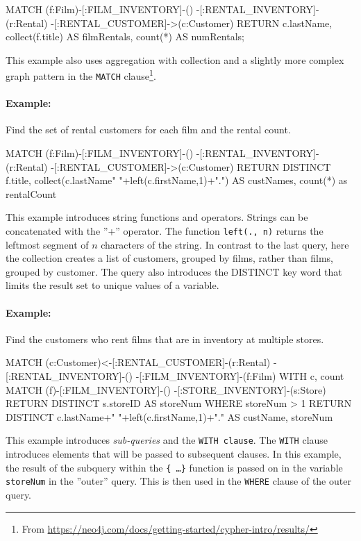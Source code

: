 \begin{withcode}
\begin{cyphercode}
MATCH (f:Film)-[:FILM_INVENTORY]-()
      -[:RENTAL_INVENTORY]-(r:Rental)
      -[:RENTAL_CUSTOMER]->(c:Customer)
RETURN c.lastName, 
       collect(f.title) AS filmRentals, 
       count(*) AS numRentals;
\end{cyphercode}

This example also uses aggregation with collection and a slightly more complex graph pattern in the \texttt{MATCH} clause\footnote{From \url{https://neo4j.com/docs/getting-started/cypher-intro/results/}}.

\paragraph*{Example:} Find the set of rental customers for each film and the rental count.

\begin{cyphercode}
MATCH (f:Film)-[:FILM_INVENTORY]-()
      -[:RENTAL_INVENTORY]-(r:Rental)
      -[:RENTAL_CUSTOMER]->(c:Customer)
RETURN DISTINCT f.title, 
      collect(c.lastName" "+left(c.firstName,1)+".") AS custNames, 
      count(*) as rentalCount
\end{cyphercode}

This example introduces string functions and operators. Strings can be concatenated with the ''+'' operator. The function \texttt{left(., n)} returns the leftmost segment of $n$ characters of the string. In contrast to the last query, here the collection creates a list of customers, grouped by films, rather than films, grouped by customer. The query also introduces the DISTINCT key word that limits the result set to unique values of a variable.

\paragraph*{Example:} Find the customers who rent films that are in inventory at multiple stores.

\begin{cyphercode}
MATCH (c:Customer)<-[:RENTAL_CUSTOMER]-(r:Rental)
       -[:RENTAL_INVENTORY]-()
       -[:FILM_INVENTORY]-(f:Film) 
WITH c, count{ 
  MATCH (f)-[:FILM_INVENTORY]-()
        -[:STORE_INVENTORY]-(s:Store) 
  RETURN DISTINCT s.storeID } AS storeNum
WHERE storeNum > 1
RETURN DISTINCT 
  c.lastName+" "+left(c.firstName,1)+"." AS custName, 
  storeNum
\end{cyphercode}

This example introduces \emph{sub-queries} and the \texttt{WITH clause}. The \texttt{WITH} clause introduces elements that will be passed to subsequent clauses. In this example, the result of the subquery within the \texttt{\{ \ldots \}} function is passed on in the variable \texttt{storeNum} in the ''outer'' query. This is then used in the \texttt{WHERE} clause of the outer query.


\end{withcode}

